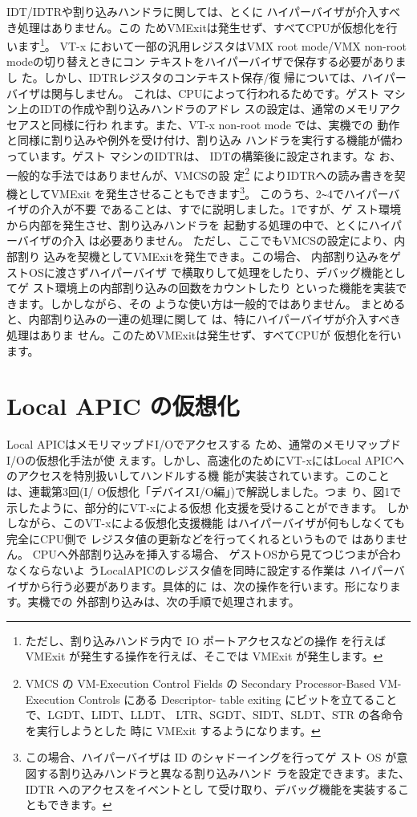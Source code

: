  IDT/IDTRや割り込みハンドラに関しては、とくに
ハイパーバイザが介入すべき処理はありません。この
ためVMExitは発生せず、すべてCPUが仮想化を行
います\footnote{
ただし、割り込みハンドラ内で IO ポートアクセスなどの操作
を行えば VMExit が発生する操作を行えば、そこでは VMExit
が発生します。 
}。
VT-x において一部の汎用レジスタはVMX
root mode/VMX non-root modeの切り替えときにコン
テキストをハイパーバイザで保存する必要がありまし
た。しかし、IDTRレジスタのコンテキスト保存/復
帰については、ハイパーバイザは関与しません。
 これは、CPUによって行われるためです。ゲスト
マシン上のIDTの作成や割り込みハンドラのアドレ
スの設定は、通常のメモリアクセアスと同様に行わ
れます。また、VT-x non-root mode では、実機での
動作と同様に割り込みや例外を受け付け、割り込み
ハンドラを実行する機能が備わっています。ゲスト
マシンのIDTRは、 IDTの構築後に設定されます。な
お、一般的な手法ではありませんが、VMCSの設
定\footnote{
VMCS の VM-Execution Control Fields の Secondary
Processor-Based VM-Execution Controls にある Descriptor-
table exiting にビットを立てることで、LGDT、LIDT、LLDT、
LTR、SGDT、SIDT、SLDT、STR の各命令を実行しようとした
時に VMExit するようになります。 
}
によりIDTRへの読み書きを契機としてVMExit
を発生させることもできます\footnote{
この場合、ハイパーバイザは ID のシャドーイングを行ってゲ
スト OS が意図する割り込みハンドラと異なる割り込みハンド
ラを設定できます。また、 IDTR へのアクセスをイベントとし
て受け取り、デバッグ機能を実装することもできます。
}。
 このうち、2\verb|~|4でハイパーバイザの介入が不要
であることは、すでに説明しました。1ですが、ゲ
スト環境から内部を発生させ、割り込みハンドラを
起動する処理の中で、とくにハイパーバイザの介入
は必要ありません。
 ただし、ここでもVMCSの設定により、内部割り
込みを契機としてVMExitを発生できま。この場合、
内部割り込みをゲストOSに渡さずハイパーバイザ
で横取りして処理をしたり、デバッグ機能としてゲ
スト環境上の内部割り込みの回数をカウントしたり
といった機能を実装できます。しかしながら、その
ような使い方は一般的ではありません。
 まとめると、内部割り込みの一連の処理に関して
は、特にハイパーバイザが介入すべき処理はありま
せん。このためVMExitは発生せず、すべてCPUが
仮想化を行います。



\section{Local APIC の仮想化}

 Local APICはメモリマップドI/Oでアクセスする
ため、通常のメモリマップドI/Oの仮想化手法が使
えます。しかし、高速化のためにVT-xにはLocal
APICへのアクセスを特別扱いしてハンドルする機
能が実装されています。このことは、連載第3回(I/
O仮想化「デバイスI/O編」)で解説しました。つま
り、図1で示したように、部分的にVT-xによる仮想
化支援を受けることができます。
 しかしながら、このVT-xによる仮想化支援機能
はハイパーバイザが何もしなくても完全にCPU側で
レジスタ値の更新などを行ってくれるというもので
はありません。 CPUへ外部割り込みを挿入する場合、
ゲストOSから見てつじつまが合わなくならないよ
うLocalAPICのレジスタ値を同時に設定する作業は
ハイパーバイザから行う必要があります。具体的に
は、次の操作を行います。形になります。実機での
外部割り込みは、次の手順で処理されます。

